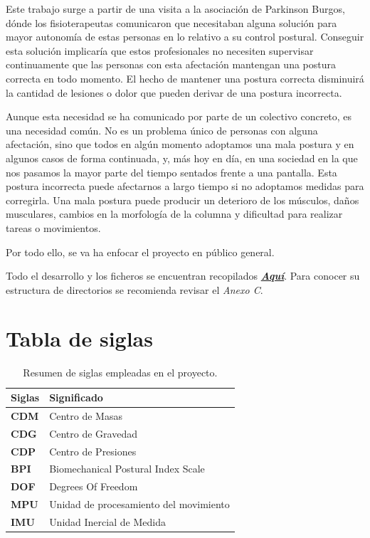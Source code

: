 
Este trabajo surge a partir de una visita a la asociación de Parkinson Burgos\cite{ParkinsonBurgos}, dónde los fisioterapeutas comunicaron que necesitaban alguna solución para mayor autonomía de estas personas en lo relativo a su control postural. Conseguir esta solución implicaría que estos profesionales no necesiten supervisar continuamente que las personas con esta afectación mantengan una postura correcta en todo momento. El hecho de mantener una postura correcta disminuirá la cantidad de lesiones o dolor que pueden derivar de una postura incorrecta.

Aunque esta necesidad se ha comunicado por parte de un colectivo concreto, es una necesidad común. No es un problema único de personas con alguna afectación, sino que todos en algún momento adoptamos una mala postura y en algunos casos de forma continuada, y, más hoy en día, en una sociedad en la que nos pasamos la mayor parte del tiempo sentados frente a una pantalla. Esta postura incorrecta puede afectarnos a largo tiempo si no adoptamos medidas para corregirla. Una mala postura puede producir un deterioro de los músculos, daños musculares, cambios en la morfología de la columna y dificultad para realizar tareas o movimientos. 

Por todo ello, se va ha enfocar el proyecto en público general.

Todo el desarrollo y los ficheros se encuentran recopilados \href{https://github.com/NaiaraGadea/TFG_DispositivoDeControlPostural}{\textbf{\textit{Aquí}}}. Para conocer su estructura de directorios se recomienda revisar el \textit{Anexo C}.

\clearpage
\section{Tabla de siglas}
\begin{table}[h!]
\centering
\begin{tabular}{ m{3cm} m{6cm}  } 
\hline
\cellcolor[HTML]{EFEFEF}\textbf{Siglas} & \cellcolor[HTML]{EFEFEF}\textbf{Significado}\\
\hline

\textbf{CDM}   & {Centro de Masas} \\
\textbf{CDG}   & {Centro de Gravedad} \\
\textbf{CDP}   & {Centro de Presiones} \\
\textbf{BPI}   & {Biomechanical Postural Index Scale} \\
\textbf{DOF}   & {Degrees Of Freedom} \\
\textbf{MPU}   & {Unidad de procesamiento del movimiento} \\
\textbf{IMU}   & {Unidad Inercial de Medida} \\


\hline
\end{tabular}
\caption{Resumen de siglas empleadas en el proyecto.}
\end{table}


